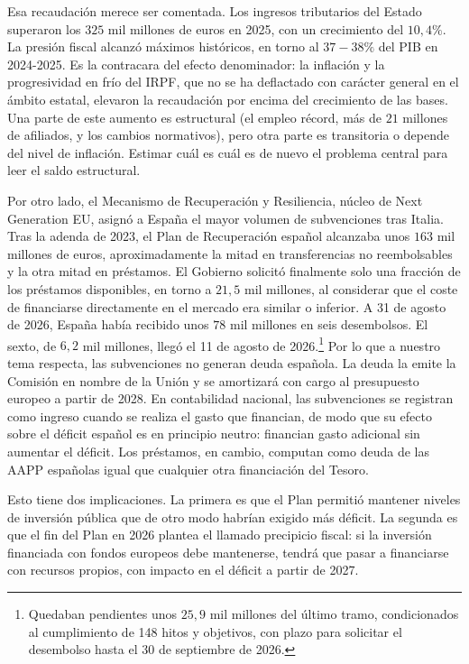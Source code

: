 \documentclass[10pt,a4paper]{article}
\begin{document}
Esa recaudación merece ser comentada. Los ingresos tributarios del Estado superaron los $325$ mil millones de euros en 2025, con un crecimiento del $10,4\%$. La presión fiscal alcanzó máximos históricos, en torno al $37-38\%$ del PIB en 2024-2025. Es la contracara del efecto denominador: la inflación y la progresividad en frío del IRPF, que no se ha deflactado con carácter general en el ámbito estatal, elevaron la recaudación por encima del crecimiento de las bases. Una parte de este aumento es estructural (el empleo récord, más de $21$ millones de afiliados, y los cambios normativos), pero otra parte es transitoria o depende del nivel de inflación. Estimar cuál es cuál es de nuevo el problema central para leer el saldo estructural.

Por otro lado, el Mecanismo de Recuperación y Resiliencia, núcleo de Next Generation EU, asignó a España el mayor volumen de subvenciones tras Italia. Tras la adenda de 2023, el Plan de Recuperación español alcanzaba unos $163$ mil millones de euros, aproximadamente la mitad en transferencias no reembolsables y la otra mitad en préstamos. El Gobierno solicitó finalmente solo una fracción de los préstamos disponibles, en torno a $21,5$ mil millones, al considerar que el coste de financiarse directamente en el mercado era similar o inferior. A 31 de agosto de 2026, España había recibido unos $78$ mil millones en seis desembolsos. El sexto, de $6,2$ mil millones, llegó el 11 de agosto de 2026.\footnote{%
    Quedaban pendientes unos $25,9$ mil millones del último tramo, condicionados al cumplimiento de 148 hitos y objetivos, con plazo para solicitar el desembolso hasta el 30 de septiembre de 2026.
} Por lo que a nuestro tema respecta, las subvenciones no generan deuda española. La deuda la emite la Comisión en nombre de la Unión y se amortizará con cargo al presupuesto europeo a partir de 2028. En contabilidad nacional, las subvenciones se registran como ingreso cuando se realiza el gasto que financian, de modo que su efecto sobre el déficit español es en principio neutro: financian gasto adicional sin aumentar el déficit. Los préstamos, en cambio, computan como deuda de las AAPP españolas igual que cualquier otra financiación del Tesoro.

Esto tiene dos implicaciones. La primera es que el Plan permitió mantener niveles de inversión pública que de otro modo habrían exigido más déficit. La segunda es que el fin del Plan en 2026 plantea el llamado precipicio fiscal: si la inversión financiada con fondos europeos debe mantenerse, tendrá que pasar a financiarse con recursos propios, con impacto en el déficit a partir de 2027.
\end{document}
